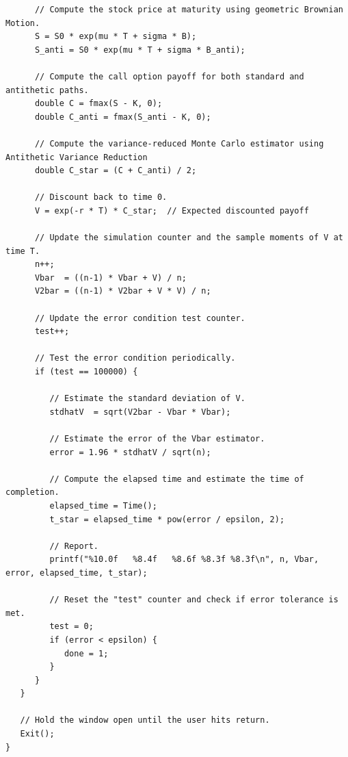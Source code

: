\documentclass{report}
\begin{document}
\begin{lstlisting}
      // Compute the stock price at maturity using geometric Brownian Motion.
      S = S0 * exp(mu * T + sigma * B); 
      S_anti = S0 * exp(mu * T + sigma * B_anti); 

      // Compute the call option payoff for both standard and antithetic paths.
      double C = fmax(S - K, 0);  
      double C_anti = fmax(S_anti - K, 0);

      // Compute the variance-reduced Monte Carlo estimator using Antithetic Variance Reduction
      double C_star = (C + C_anti) / 2; 

      // Discount back to time 0.
      V = exp(-r * T) * C_star;  // Expected discounted payoff

      // Update the simulation counter and the sample moments of V at time T.
      n++; 
      Vbar  = ((n-1) * Vbar + V) / n; 
      V2bar = ((n-1) * V2bar + V * V) / n; 

      // Update the error condition test counter.
      test++;

      // Test the error condition periodically.
      if (test == 100000) {

         // Estimate the standard deviation of V.
         stdhatV  = sqrt(V2bar - Vbar * Vbar);

         // Estimate the error of the Vbar estimator.
         error = 1.96 * stdhatV / sqrt(n);

         // Compute the elapsed time and estimate the time of completion.
         elapsed_time = Time();
         t_star = elapsed_time * pow(error / epsilon, 2);

         // Report.
         printf("%10.0f   %8.4f   %8.6f %8.3f %8.3f\n", n, Vbar, error, elapsed_time, t_star);

         // Reset the "test" counter and check if error tolerance is met.
         test = 0;
         if (error < epsilon) {
            done = 1;
         }
      }
   }

   // Hold the window open until the user hits return.
   Exit();
}
\end{lstlisting}

\pagebreak
\end{document}
